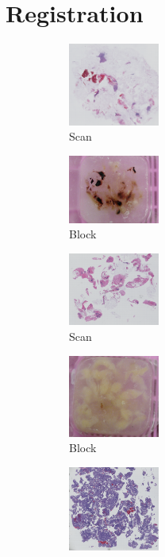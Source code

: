 \documentclass[letterpaper,10pt,oneside]{article}
\begin{document}
\section{Registration}
\begin{figure}[hbtp]
	\centering
  \begin{subfigure}[b]{.2\textwidth}
    \includegraphics[width=3cm]{images/PO13-00516A1_1_7_201305171148.png}
    \caption{Scan}
  \end{subfigure}
  \begin{subfigure}[b]{.2\textwidth}
	  \includegraphics[width=3cm]{images/PO1300516_A1.JPG}
    \caption{Block}
  \end{subfigure}
  \begin{subfigure}[b]{.2\textwidth}
	  \includegraphics[width=3cm]{images/PO14-00496A1Level1_1_2_201404181459.png} 
    \caption{Scan}
  \end{subfigure}
  \begin{subfigure}[b]{.2\textwidth}
	  \includegraphics[width=3cm]{images/PO1400496_A1.JPG} 
    \caption{Block}
  \end{subfigure}
  \begin{subfigure}[b]{.2\textwidth}
	  \includegraphics[width=3cm]{images/PO14-00482B3_1_2_201404171123.png} 

\end{subfigure}
\end{figure}
\end{document}
